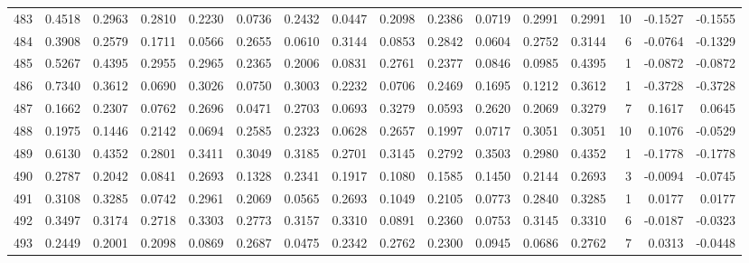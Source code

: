 \begin{tabular}{lrrrrrrrrrrrrrrr}
483 &      0.4518 &  0.2963 &  0.2810 &  0.2230 &  0.0736 &  0.2432 &  0.0447 &  0.2098 &  0.2386 &  0.0719 &   0.2991 &     0.2991 &     10 &                   -0.1527 &                    -0.1555 \\
484 &      0.3908 &  0.2579 &  0.1711 &  0.0566 &  0.2655 &  0.0610 &  0.3144 &  0.0853 &  0.2842 &  0.0604 &   0.2752 &     0.3144 &      6 &                   -0.0764 &                    -0.1329 \\
485 &      0.5267 &  0.4395 &  0.2955 &  0.2965 &  0.2365 &  0.2006 &  0.0831 &  0.2761 &  0.2377 &  0.0846 &   0.0985 &     0.4395 &      1 &                   -0.0872 &                    -0.0872 \\
486 &      0.7340 &  0.3612 &  0.0690 &  0.3026 &  0.0750 &  0.3003 &  0.2232 &  0.0706 &  0.2469 &  0.1695 &   0.1212 &     0.3612 &      1 &                   -0.3728 &                    -0.3728 \\
487 &      0.1662 &  0.2307 &  0.0762 &  0.2696 &  0.0471 &  0.2703 &  0.0693 &  0.3279 &  0.0593 &  0.2620 &   0.2069 &     0.3279 &      7 &                    0.1617 &                     0.0645 \\
488 &      0.1975 &  0.1446 &  0.2142 &  0.0694 &  0.2585 &  0.2323 &  0.0628 &  0.2657 &  0.1997 &  0.0717 &   0.3051 &     0.3051 &     10 &                    0.1076 &                    -0.0529 \\
489 &      0.6130 &  0.4352 &  0.2801 &  0.3411 &  0.3049 &  0.3185 &  0.2701 &  0.3145 &  0.2792 &  0.3503 &   0.2980 &     0.4352 &      1 &                   -0.1778 &                    -0.1778 \\
490 &      0.2787 &  0.2042 &  0.0841 &  0.2693 &  0.1328 &  0.2341 &  0.1917 &  0.1080 &  0.1585 &  0.1450 &   0.2144 &     0.2693 &      3 &                   -0.0094 &                    -0.0745 \\
491 &      0.3108 &  0.3285 &  0.0742 &  0.2961 &  0.2069 &  0.0565 &  0.2693 &  0.1049 &  0.2105 &  0.0773 &   0.2840 &     0.3285 &      1 &                    0.0177 &                     0.0177 \\
492 &      0.3497 &  0.3174 &  0.2718 &  0.3303 &  0.2773 &  0.3157 &  0.3310 &  0.0891 &  0.2360 &  0.0753 &   0.3145 &     0.3310 &      6 &                   -0.0187 &                    -0.0323 \\
493 &      0.2449 &  0.2001 &  0.2098 &  0.0869 &  0.2687 &  0.0475 &  0.2342 &  0.2762 &  0.2300 &  0.0945 &   0.0686 &     0.2762 &      7 &                    0.0313 &                    -0.0448 \\

\end{tabular}
